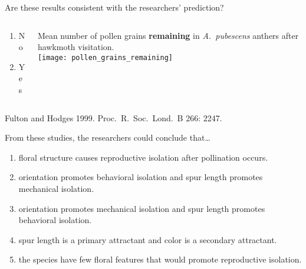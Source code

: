 \documentclass[t,hidelinks]{beamer}
\newcommand{\ques}[1]{\highlight{\textsc{q#1:}}}
\begin{document}
%
\begin{frame}[t]{\ques{8} Are these results consistent with the researchers' prediction?}
		\begin{columns}[t]
		\begin{column}{0.28\textwidth}
			\begin{enumerate}
				\item No
				\item \alert<2>{Yes}
			\end{enumerate}
		\end{column}
		\begin{column}{0.5\textwidth}
			Mean number of pollen grains \textbf{remaining} in \textit{A.~pubescens} anthers after hawkmoth visitation.\\[1ex]
			\texttt{[image: pollen\_grains\_remaining]}
		\end{column}
	\end{columns}
	
	\vfilll
	
	\tiny Fulton and Hodges 1999. Proc.~R.~Soc.~Lond.~B 266: 2247.
\end{frame}
%
\begin{frame}[t]{\ques{9} From these studies, the researchers could conclude that\dots}
	
	\begin{enumerate}
		\item floral structure causes reproductive isolation after pollination occurs.
		
		\item \alert<2>{orientation promotes behavioral isolation and spur length promotes mechanical isolation.}

		\item orientation promotes mechanical isolation and spur length promotes behavioral isolation.
		
		\item spur length is a primary attractant and color is a secondary attractant.

		\item the species have few floral features that would promote reproductive isolation.
		
	\end{enumerate}

\end{frame}
%
\end{document}
